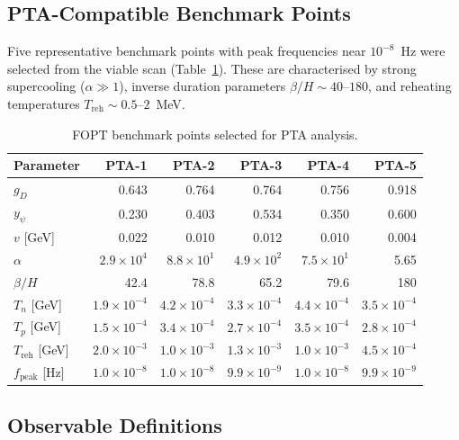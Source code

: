 \documentclass[12pt,a4paper]{article}
\begin{document}
\subsection{PTA-Compatible Benchmark Points}

Five representative benchmark points with peak frequencies near $10^{-8}$~Hz were selected from the viable scan (Table~\ref{tab:benchmarks}). These are characterised by strong supercooling ($\alpha \gg 1$), inverse duration parameters $\beta/H \sim 40$--$180$, and reheating temperatures $T_\text{reh} \sim 0.5$--$2$~MeV.

\begin{table}[H]
\centering
\caption{FOPT benchmark points selected for PTA analysis.}
\label{tab:benchmarks}
\small
\begin{tabular}{lrrrrr}
\toprule
Parameter & PTA-1 & PTA-2 & PTA-3 & PTA-4 & PTA-5 \\
\midrule
$g_D$ & 0.643 & 0.764 & 0.764 & 0.756 & 0.918 \\
$y_\psi$ & 0.230 & 0.403 & 0.534 & 0.350 & 0.600 \\
$v$ [GeV] & 0.022 & 0.010 & 0.012 & 0.010 & 0.004 \\
\midrule
$\alpha$ & $2.9\times10^4$ & $8.8\times10^1$ & $4.9\times10^2$ & $7.5\times10^1$ & 5.65 \\
$\beta/H$ & 42.4 & 78.8 & 65.2 & 79.6 & 180 \\
$T_n$ [GeV] & $1.9\times10^{-4}$ & $4.2\times10^{-4}$ & $3.3\times10^{-4}$ & $4.4\times10^{-4}$ & $3.5\times10^{-4}$ \\
$T_p$ [GeV] & $1.5\times10^{-4}$ & $3.4\times10^{-4}$ & $2.7\times10^{-4}$ & $3.5\times10^{-4}$ & $2.8\times10^{-4}$ \\
$T_\text{reh}$ [GeV] & $2.0\times10^{-3}$ & $1.0\times10^{-3}$ & $1.3\times10^{-3}$ & $1.0\times10^{-3}$ & $4.5\times10^{-4}$ \\
$f_\text{peak}$ [Hz] & $1.0\times10^{-8}$ & $1.0\times10^{-8}$ & $9.9\times10^{-9}$ & $1.0\times10^{-8}$ & $9.9\times10^{-9}$ \\
\bottomrule
\end{tabular}
\end{table}

\subsection{Observable Definitions}
\end{document}
